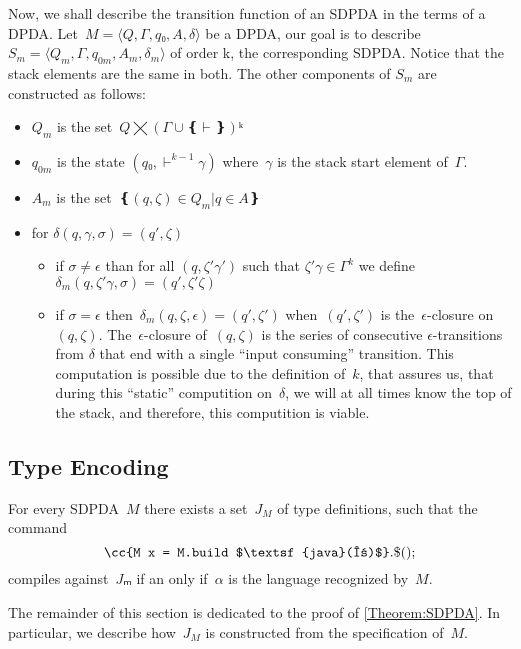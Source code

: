 Now, we shall describe the transition function of an SDPDA in the terms of a DPDA.
Let~$M=⟨Q,Γ,q₀,A,δ⟩$ be a DPDA, our goal is to describe~$S_m=⟨Q_m,Γ,q_{0m},A_m,δ_m⟩$ 
  of order k, the corresponding SDPDA.
Notice that the stack elements are the same in both.
The other components of $S_m$ are constructed as follows:
\begin{itemize}
 \item $Q_m$ is the set~$Q⨉\left(Γ∪❴\vdash❵\right)ᵏ$ 
 \item $q_{0m}$ is the state $(q₀,\vdash^{k-1}\gamma)$ where~$\gamma$ is the stack start element of~$Γ$.
 \item $A_m$ is the set~$❴(q,ζ)\in Q_m | q \in A❵$
 \item for $\delta(q,\gamma,\sigma) = (q',\zeta)$
 \begin{itemize}
  \item if $\sigma\neq\epsilon$ than for all $(q,\zeta'\gamma')$ such that $\zeta'\gamma \in \Gamma^k$
    we define $\delta_m(q,\zeta'\gamma,\sigma)=(q',\zeta'\zeta)$
  \item if $\sigma = \epsilon$ then~$\delta_m(q,\zeta,\epsilon)=(q',\zeta')$ when~$(q',\zeta')$ 
    is the~$\epsilon$-closure on~$(q,\zeta)$.
    The~$\epsilon$-closure of~$(q,\zeta)$ is the series of consecutive $\epsilon$-transitions from $\delta$
    that end with a single ``input consuming'' transition. 
    This computation is possible due to the definition of~$k$, that assures us, that during this ``static''
    computition on~$\delta$, we will at all times know the top of the stack, and therefore, this computition
    is viable.
 \end{itemize}

\end{itemize}

\subsection{Type Encoding}
\begin{Theorem}
  \label{Theorem:SDPDA}
  For every SDPDA~$M$ there exists a set~$J_M$ of \Java type definitions, such that
  the command \[
    \cc{M x = M.build $\textsf{java}(α)$}.\$();
  \]
  compiles against~$Jₘ$ if an only if~$α$ is the language recognized by~$M$.
\end{Theorem}

The remainder of this section is dedicated to the proof of \cref{Theorem:SDPDA}.
In particular, we describe how~$J_M$ is constructed from the
  specification of~$M$.

